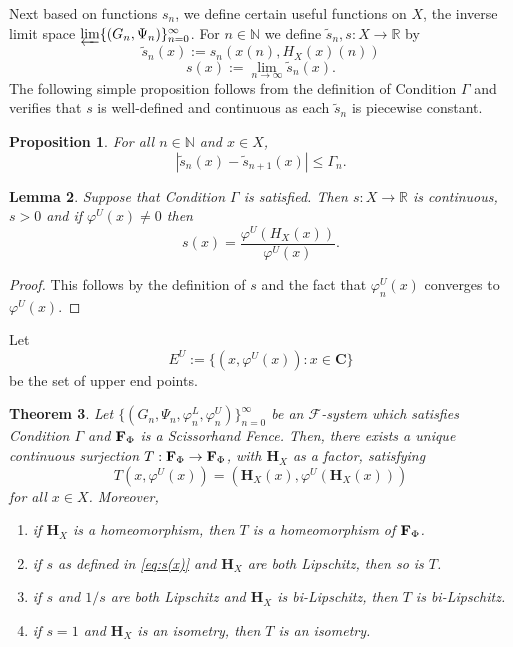 \documentclass[11pt]{amsart}
\newtheorem{theorem}{Theorem}[section]
\newtheorem{lemma}[theorem]{Lemma}
\newtheorem{proposition}[theorem]{Proposition}
\newcommand{\N}{\mathbb{N}}  %
\newcommand{\R}{\mathbb{R}}  %
\newcommand{\cantor}{\mathbf C}
\newcommand{\homeocantor}{{\mathbf H}_{X}}
\newcommand{\cF}{\mathcal{F}}
\newcommand{\csystem}{\{(G_n,\Psi_n)\}_{n=0}^{\infty}}
\newcommand{\fsystem}{\{(G_n, \Psi_n,\varphi^L_n,\varphi^U_n)\}_{n=0}^{\infty}}
\begin{document}
{Next based on functions $s_n$, we define certain useful functions on $X$,  the inverse limit space $\varprojlim\csystem$. For $n \in \N$ we define $\tilde{s}_n, s:X \rightarrow \mathbb{R}$ by 
\[\tilde{s}_n(x):= s_n(x(n),H_X(x)(n))\]
\begin{equation}\label{eq:s(x)}
s(x):= \lim_{n\to \infty} \tilde{s}_n (x).
\end{equation}
The following simple proposition follows from the definition of Condition $\Gamma$ and verifies that $s$ is well-defined and continuous as each $\tilde{s}_n$ is piecewise constant.
\begin{proposition}\label{prop:sncauchy}
 For all $n \in \N$ and $x \in X$, \[|\tilde{s}_n (x) - \tilde{s}_{n+1} (x)| \le \Gamma_n. \]
\end{proposition}
\begin{lemma}\label{lem:contS}
Suppose that Condition $\Gamma$ is satisfied. Then $s:X \to \R$ is continuous, $s>0$ and if $\varphi^U(x) \neq 0$ then
\[
s(x) = 
 \frac{\varphi^U(H_X(x)) }{\varphi^U(x)}.
\]
\end{lemma}

\begin{proof}
This follows by the definition of $s$ and the fact that $\varphi_n^U(x)$ converges to $\varphi^U(x)$.
\end{proof}



Let \[E^{U} := \{(x, \varphi^U(x)):x \in \cantor\}\] be the set of upper end points.



\begin{theorem}\label{thm:mainF}
Let $\fsystem$ be an $\cF$-system which satisfies Condition $\Gamma$ and  ${\bf F}_{\Phi}$ is a Scissorhand Fence. 
Then, there exists a unique continuous surjection $T: {\bf F}_{\Phi}\rightarrow {\bf F}_{\Phi}$, with $\homeocantor$ as a factor, satisfying \[T\left(x, \varphi^U(x)\right)=\left(\homeocantor(x), \varphi^U(\homeocantor(x))\right)\] for all $x \in X$.
 Moreover, 
 \begin{enumerate}
         \item if $\homeocantor$ is a homeomorphism, then $T$ is a homeomorphism of ${\bf F}_{\Phi}$.
     \item if $s$ as defined in \eqref{eq:s(x)} and $\homeocantor$ are both Lipschitz, then so is $T$.
     \item if $s$ and $1/s$ are both Lipschitz and $\homeocantor$ is bi-Lipschitz, then $T$ is bi-Lipschitz.
     \item if $s=1$ and $\homeocantor$ is an isometry, then $T$ is an isometry.
 \end{enumerate}
\end{theorem}

}
\end{document}
